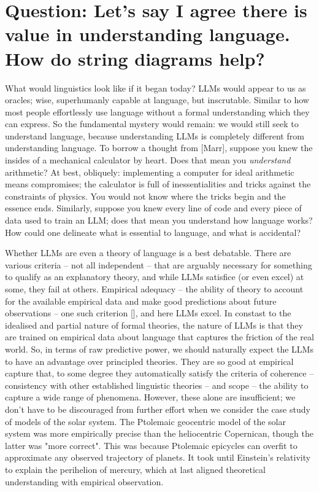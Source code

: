 \section{\textbf{Question:} Let's say I agree there is value in understanding language. How do string diagrams help?}

What would linguistics look like if it began today? LLMs would appear to us as oracles; wise, superhumanly capable at language, but inscrutable. Similar to how most people effortlessly use language without a formal understanding which they can express. So the fundamental mystery would remain: we would still seek to understand language, because understanding LLMs is completely different from understanding language. To borrow a thought from [Marr], suppose you knew the insides of a mechanical calculator by heart. Does that mean you \emph{understand} arithmetic? At best, obliquely: implementing a computer for ideal arithmetic means compromises; the calculator is full of inessentialities and tricks against the constraints of physics. You would not know where the tricks begin and the essence ends. Similarly, suppose you knew every line of code and every piece of data used to train an LLM; does that mean you understand how language works? How could one delineate what is essential to language, and what is accidental?\\


Whether LLMs are even a theory of language is a best debatable. There are various criteria -- not all independent -- that are arguably necessary for something to qualify as an explanatory theory, and while LLMs satisfice (or even excel) at some, they fail at others. Empirical adequacy -- the ability of theory to account for the available empirical data and make good predictions about future observations -- one such criterion [], and here LLMs excel. In constast to the idealised and partial nature of formal theories, the nature of LLMs is that they are trained on empirical data about language that captures the friction of the real world. So, in terms of raw predictive power, we should naturally expect the LLMs to have an advantage over principled theories. They are so good at empirical capture that, to some degree they automatically satisfy the criteria of coherence -- consistency with other established linguistic theories -- and scope -- the ability to capture a wide range of phenomena. However, these alone are insufficient; we don't have to be discouraged from further effort when we consider the case study of models of the solar system. The Ptolemaic geocentric model of the solar system was more empirically precise than the heliocentric Copernican, though the latter was "more correct". This was because Ptolemaic epicycles can overfit to approximate any observed trajectory of planets. It took until Einstein's relativity to explain the perihelion of mercury, which at last aligned theoretical understanding with empirical observation.\\

